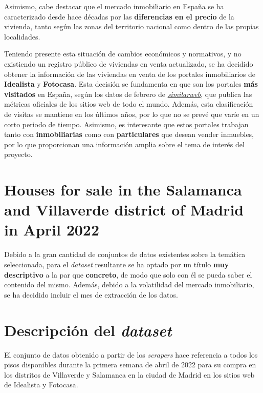 \documentclass[12pt]{article}
\begin{document}
Asimismo, cabe destacar que el mercado inmobiliario en España se ha caracterizado desde hace décadas por las \textbf{diferencias en el precio} de la vivienda, tanto según las zonas del territorio nacional como dentro de las propias localidades. 

Teniendo presente esta situación de cambios económicos y normativos, y no existiendo un registro público de viviendas en venta actualizado, se ha decidido obtener la información de las viviendas en venta de los portales inmobiliarios de \textbf{Idealista} y \textbf{Fotocasa}. Esta decisión se fundamenta en que son los portales \textbf{más visitados} en España, según los datos de febrero de \href{https://www.similarweb.com/top-websites/spain/category/business-and-consumer-services/real-estate/}{\textit{similarweb}}, que publica las métricas oficiales de los sitios web de todo el mundo. Además, esta clasificación de visitas se mantiene en los últimos años, por lo que no se prevé que varíe en un corto periodo de tiempo. Asimismo, es interesante que estos portales trabajan tanto con \textbf{inmobiliarias} como con \textbf{particulares} que desean vender inmuebles, por lo que proporcionan una información amplia sobre el tema de interés del proyecto.

\vspace{-1.5em}\section{Houses for sale in the Salamanca and Villaverde district of Madrid in April 2022}\vspace{-1.5em}

Debido a la gran cantidad de conjuntos de datos existentes sobre la temática seleccionada, para el \textit{dataset} resultante se ha optado por un título \textbf{muy descriptivo} a la par que \textbf{concreto}, de modo que solo con él se pueda saber el contenido del mismo. Además, debido a la volatilidad del mercado inmobiliario, se ha decidido incluir el mes de extracción de los datos.

\vspace{-1.5em}\section{Descripción del \textit{dataset}}\vspace{-1.5em}

El conjunto de datos obtenido a partir de los \textit{scrapers} hace referencia a todos los pisos disponibles durante la primera semana de abril de 2022 para su compra en los distritos de Villaverde y Salamanca en la ciudad de Madrid en los sitios web de Idealista y Fotocasa.
\end{document}

